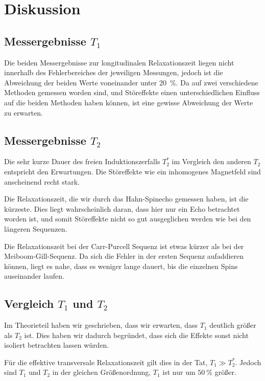 \chapter{Diskussion}

\section{Messergebnisse $T_1$}

Die beiden Messergebnisse zur longitudinalen Relaxationszeit liegen nicht
innerhalb des Fehlerbereiches der jeweiligen Messungen, jedoch ist die
Abweichung der beiden Werte voneinander unter \SI{20}{\percent}. Da auf zwei
verschiedene Methoden gemessen worden sind, und Störeffekte einen
unterschiedlichen Einfluss auf die beiden Methoden haben können, ist eine
gewisse Abweichung der Werte zu erwarten.

\section{Messergebnisse $T_2$}

Die sehr kurze Dauer des freien Induktionszerfalls $T_2^*$ im Vergleich den
anderen $T_2$ entspricht den Erwartungen. Die Störeffekte wie ein inhomogenes
Magnetfeld sind anscheinend recht stark.

Die Relaxationszeit, die wir durch das Hahn-Spinecho gemessen haben, ist die
kürzeste. Dies liegt wahrscheinlich daran, dass hier nur ein Echo betrachtet
worden ist, und somit Störeffekte nicht so gut ausgeglichen werden wie bei den
längeren Sequenzen.

Die Relaxationszeit bei der Carr-Purcell Sequenz ist etwas kürzer als bei der
Meiboom-Gill-Sequenz. Da sich die Fehler in der ersten Sequenz aufaddieren
können, liegt es nahe, dass es weniger lange dauert, bis die einzelnen Spins
auseinander laufen.

\section{Vergleich $T_1$ und $T_2$}

Im Theorieteil haben wir geschrieben, dass wir erwarten, dass $T_1$ deutlich
größer als $T_2$ ist. Dies haben wir dadurch begründet, dass sich die Effekte
sonst nicht isoliert betrachten lassen würden.

Für die effektive transversale Relaxationszeit gilt dies in der Tat, $T_1 \gg
T_2^*$. Jedoch sind $T_1$ und $T_2$ in der gleichen Größenordnung, $T_1$ ist
nur um $\SI{50}{\percent}$ größer.

